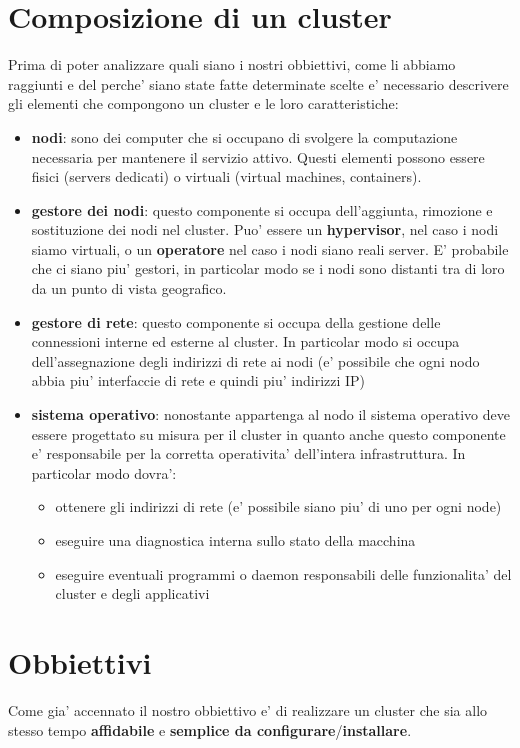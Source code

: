 \documentclass[a4paper]{article}
\begin{document}
\section{Composizione di un cluster}
Prima di poter analizzare quali siano i nostri obbiettivi, come li abbiamo raggiunti
e del perche' siano state fatte determinate scelte e' necessario descrivere gli elementi 
che compongono un cluster e le loro caratteristiche:
\begin{itemize}
    \item \textbf{nodi}: sono dei computer che si occupano di svolgere la computazione necessaria
        per mantenere il servizio attivo. 
        Questi elementi possono essere fisici (servers dedicati)
        o virtuali (virtual machines, containers).
    \item \textbf{gestore dei nodi}: questo componente si occupa dell'aggiunta, rimozione
        e sostituzione dei nodi nel cluster. Puo' essere un \textbf{hypervisor}, nel caso
        i nodi siamo virtuali, o un \textbf{operatore} nel caso i nodi siano reali server.
        E' probabile che ci siano piu' gestori, in particolar modo se i nodi sono distanti tra di
        loro da un punto di vista geografico.
    \item \textbf{gestore di rete}: questo componente si occupa della gestione delle connessioni 
        interne ed esterne al cluster. In particolar modo si occupa dell'assegnazione degli 
        indirizzi di rete ai nodi (e' possibile che ogni nodo abbia piu' interfaccie di rete e 
        quindi piu' indirizzi IP)
    \item \textbf{sistema operativo}: nonostante appartenga al nodo il sistema operativo deve essere
        progettato su misura per il cluster in quanto anche questo componente e' responsabile
        per la corretta operativita' dell'intera infrastruttura. 
        In particolar modo dovra':
    \begin{itemize}
        \item ottenere gli indirizzi di rete (e' possibile siano piu' di uno per ogni node)
        \item eseguire una diagnostica interna sullo stato della macchina
        \item eseguire eventuali programmi o daemon responsabili delle funzionalita' del cluster
            e degli applicativi
    \end{itemize}
\end{itemize}


\section{Obbiettivi}
Come gia' accennato il nostro obbiettivo e' di realizzare un cluster che sia allo stesso tempo
\textbf{affidabile} e \textbf{semplice da configurare}/\textbf{installare}.
\end{document}
